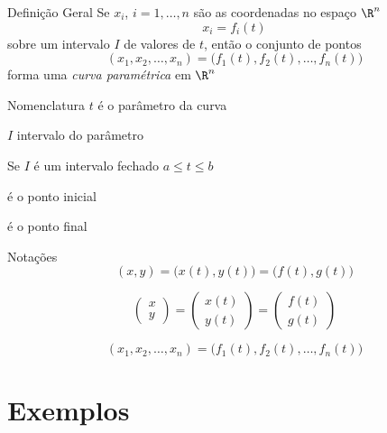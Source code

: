 \documentclass[fleqn,utf8,aspectratio=169,12pt,ignorenonframetext]{beamer}
\begin{document}
\begin{frame}{Definição Geral}
  Se $x_i$, $i=1, \dots, n$ são as coordenadas no espaço $\R^n$
  \[
    x_i = f_i(t)
  \]
  sobre um intervalo $I$ de valores de $t$,
  então o conjunto de pontos
  \[
    (x_1, x_2, \dots, x_n) = \big( f_1(t), f_2(t), \dots, f_n(t)\big)
  \]
  forma uma \emph{curva paramétrica} em $\R^n$
\end{frame}

\begin{frame}{Nomenclatura}
  \emph{$t$} \quad é o parâmetro da curva

  \pause
  \emph{$I$} \quad intervalo do parâmetro

  \pause
  \vspace{\baselineskip}
  Se $I$ é um intervalo fechado \emph{\(a\leq t \leq b\)}
  \pause
  \begin{description}[<+->]
    \item[\(\big(f(a), g(a)\big)\)] é o ponto inicial
    \item[\(\big(f(b), g(b)\big)\)] é o ponto final
  \end{description}
\end{frame}

\begin{frame}{Notações}
  \[
    (x, y)
    = \big(x(t), y(t)\big)
    = \big(f(t), g(t)\big)
  \]

  \pause
  \[
      \begin{pmatrix}  x    \\ y    \end{pmatrix}
    = \begin{pmatrix}  x(t) \\ y(t) \end{pmatrix}
    = \begin{pmatrix}  f(t) \\ g(t) \end{pmatrix}
  \]

  \pause
  \[
    (x_1, x_2, \dots, x_n) = \big( f_1(t), f_2(t), \dots, f_n(t)\big)
  \]
\end{frame}

\section{Exemplos}
\end{document}

